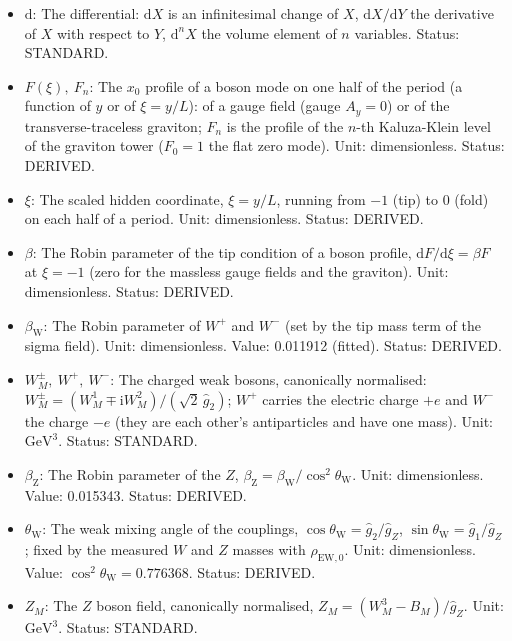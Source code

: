 \documentclass[
  10pt,
]{article}
\providecommand{\tightlist}{%
  \setlength{\itemsep}{0pt}\setlength{\parskip}{0pt}}
\begin{document}
\begin{itemize}
\tightlist
\item
  \(\mathrm{d}\): The differential: \(\mathrm{d}X\) is an infinitesimal
  change of \(X\), \(\mathrm{d}X/\mathrm{d}Y\) the derivative of \(X\)
  with respect to \(Y\), \(\mathrm{d}^nX\) the volume element of \(n\)
  variables. Status: STANDARD.
\item
  \(F(\xi),\ F_n\): The \(x_0\) profile of a boson mode on one half of
  the period (a function of \(y\) or of \(\xi = y/L\)): of a gauge field
  (gauge \(A_y = 0\)) or of the transverse-traceless graviton; \(F_n\)
  is the profile of the \(n\)-th Kaluza-Klein level of the graviton
  tower (\(F_0 = 1\) the flat zero mode). Unit: dimensionless. Status:
  DERIVED.
\item
  \(\xi\): The scaled hidden coordinate, \(\xi = y/L\), running from
  \(-1\) (tip) to \(0\) (fold) on each half of a period. Unit:
  dimensionless. Status: DERIVED.
\item
  \(\beta\): The Robin parameter of the tip condition of a boson
  profile, \(\mathrm{d}F/\mathrm{d}\xi = \beta F\) at \(\xi = -1\) (zero
  for the massless gauge fields and the graviton). Unit: dimensionless.
  Status: DERIVED.
\item
  \(\beta_{\mathrm{W}}\): The Robin parameter of \(W^+\) and \(W^-\)
  (set by the tip mass term of the sigma field). Unit: dimensionless.
  Value: 0.011912 (fitted). Status: DERIVED.
\item
  \(W^\pm_M,\ W^+,\ W^-\): The charged weak bosons, canonically
  normalised:
  \(W^\pm_M = (W^1_M \mp \mathrm{i}W^2_M)/(\sqrt2\,\hat g_2)\); \(W^+\)
  carries the electric charge \(+e\) and \(W^-\) the charge \(-e\) (they
  are each other's antiparticles and have one mass). Unit:
  \(\mathrm{GeV}^{3}\). Status: STANDARD.
\item
  \(\beta_{\mathrm{Z}}\): The Robin parameter of the \(Z\),
  \(\beta_{\mathrm{Z}} = \beta_{\mathrm{W}}/\cos^2\theta_{\mathrm{W}}\).
  Unit: dimensionless. Value: 0.015343. Status: DERIVED.
\item
  \(\theta_{\mathrm{W}}\): The weak mixing angle of the couplings,
  \(\cos\theta_{\mathrm{W}} = \hat g_2/\hat g_Z\),
  \(\sin\theta_{\mathrm{W}} = \hat g_1/\hat g_Z\); fixed by the measured
  \(W\) and \(Z\) masses with \(\rho_{\mathrm{EW},0}\). Unit:
  dimensionless. Value: \(\cos^2\theta_{\mathrm{W}} = 0.776368\).
  Status: DERIVED.
\item
  \(Z_M\): The \(Z\) boson field, canonically normalised,
  \(Z_M = (W^3_M - B_M)/\hat g_Z\). Unit: \(\mathrm{GeV}^{3}\). Status:
  STANDARD.
\end{itemize}
\end{document}
